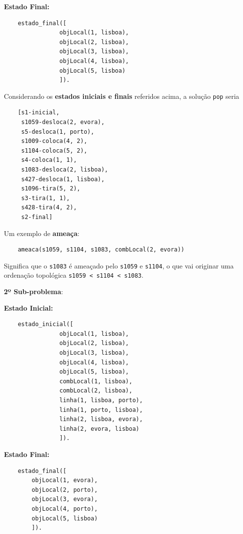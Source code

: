 \documentclass[11pt]{article}
\begin{document}
\newpage
\hspace{1,2cm}\textbf{Estado Final:}

\begin{lstlisting}
    estado_final([
                objLocal(1, lisboa),
                objLocal(2, lisboa),
                objLocal(3, lisboa),
                objLocal(4, lisboa),
                objLocal(5, lisboa)
                ]).
\end{lstlisting}

Considerando os \textbf{estados iniciais e finais} referidos acima, a solução \verb|pop| seria

\begin{lstlisting}
    [s1-inicial,
     s1059-desloca(2, evora),
     s5-desloca(1, porto),
     s1009-coloca(4, 2),
     s1104-coloca(5, 2),
     s4-coloca(1, 1),
     s1083-desloca(2, lisboa),
     s427-desloca(1, lisboa),
     s1096-tira(5, 2),
     s3-tira(1, 1),
     s428-tira(4, 2),
     s2-final]
\end{lstlisting}

Um exemplo de \textbf{ameaça}:

\begin{lstlisting}
    ameaca(s1059, s1104, s1083, combLocal(2, evora))
\end{lstlisting}

Significa que o \verb|s1083| é ameaçado pelo \verb|s1059| e \verb|s1104|, o que vai originar uma
ordenação topológica \verb|s1059 < s1104 < s1083|.

\newpage

\textbf{2º Sub-problema}:

\hspace{1,2cm}\textbf{Estado Inicial:}

\begin{lstlisting}
    estado_inicial([
                objLocal(1, lisboa),
                objLocal(2, lisboa),
                objLocal(3, lisboa),
                objLocal(4, lisboa),
                objLocal(5, lisboa),
                combLocal(1, lisboa),
                combLocal(2, lisboa),
                linha(1, lisboa, porto),
                linha(1, porto, lisboa),
                linha(2, lisboa, evora),
                linha(2, evora, lisboa)
                ]).
\end{lstlisting}

\hspace{1,2cm}\textbf{Estado Final:}

\begin{lstlisting}
    estado_final([
        objLocal(1, evora),
        objLocal(2, porto),
        objLocal(3, evora),
        objLocal(4, porto),
        objLocal(5, lisboa)
        ]).
\end{lstlisting}
\end{document}
